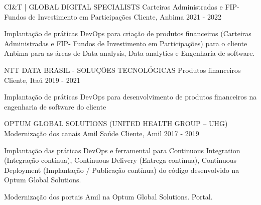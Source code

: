 

\begin{cventries}

  \cventry
    {CI\&T | GLOBAL DIGITAL SPECIALISTS} %
    {Carteiras Administradas e FIP-Fundos de Investimento em Participações} %
    {Cliente, Anbima} %
    {2021 - 2022} %
    {
      \begin{cvitems} %
        \item {Implantação de práticas DevOps para criação de produtos financeiros (Carteiras Administradas e FIP- Fundos de Investimento em Participações) para o cliente Anbima para as áreas de Data analysis, Data analytics e Engenharia de software.}
      \end{cvitems}
    }

  \cventry
    {NTT DATA BRASIL - SOLUÇÕES TECNOLÓGICAS} %
    {Produtos financeiros} %
    {Cliente, Itaú} %
    {2019 - 2021} %
    {
      \begin{cvitems} %
        \item {Implantação de práticas DevOps para desenvolvimento de produtos financeiros na engenharia de software do cliente}
      \end{cvitems}
    }

  \cventry
    {OPTUM GLOBAL SOLUTIONS (UNITED HEALTH GROUP – UHG)} %
    {Modernização dos canais Amil Saúde} %
    {Cliente, Amil} %
    {2017 - 2019} %
    {
      \begin{cvitems} %
        \item {Implantação das práticas DevOps e ferramental para Continuous Integration (Integração contínua), Continuous Delivery (Entrega contínua), Continuous Deployment (Implantação / Publicação contínua) do código desenvolvido na Optum Global Solutions.}
        \item {Modernização dos portais Amil na Optum Global Solutions. Portal.}
      \end{cvitems}
}

\end{cventries}
